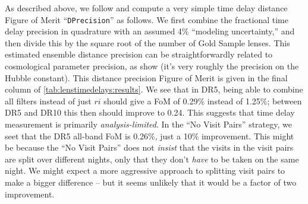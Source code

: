 As described above, we follow \citet{Coe+Moustakas2009} and compute a
very simple time delay distance Figure of Merit ``\texttt{DPrecision}''
as follows. We first combine the fractional time delay precision in
quadrature with an assumed 4\% ``modeling uncertainty,'' and then divide
this by the square root of the number of Gold Sample lenses. This
estimated ensemble distance precision can be straightforwardly related
to cosmological parameter precision, as \citet{Coe+Moustakas2009} show
(it's very roughly the precision on the Hubble constant).  This distance
precision Figure of Merit is given in the final column of
\autoref{tab:lenstimedelays:results}. We see that in DR5, being able to
combine all filters instead of just $ri$ should give a FoM of 0.29\%
instead of 1.25\%; between DR5 and DR10 this then should improve to
0.24. This suggests that time delay measurement is primarily {\it
analysis-limited}. In the ``No Visit Pairs'' strategy, we seet that the
DR5 all-band FoM is 0.26\%, just a 10\% improvement. This might be
because the ``No Visit Pairs'' does not {\it insist} that the visits in
the visit pairs are split over different nights, only that they don't
{\it have} to be taken on the same night. We might expect a more
aggressive approach to splitting visit pairs to make a bigger difference --
but it seems unlikely that it would be a factor of two improvement.

